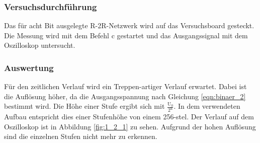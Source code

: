 \documentclass[12pt,a4paper]{article}
\begin{document}
\subsubsection*{Versuchsdurchführung}

Das für acht Bit ausgelegte R-2R-Netzwerk wird auf das Versuchsboard gesteckt. Die Messung wird mit dem Befehl c gestartet und das Ausgangssignal mit dem Oszilloskop  untersucht.

\subsubsection*{Auswertung}

Für den zeitlichen Verlauf wird ein Treppen-artiger Verlauf erwartet. Dabei ist die Auflösung höher, da die Ausgangsspannung nach Gleichung \ref{eqn:binaer_2} bestimmt wird. Die Höhe einer Stufe ergibt sich mit $\frac{\text{U}_0}{2^\text{n}}$. In dem verwendeten Aufbau entspricht dies einer Stufenhöhe von einem 256-stel. Der Verlauf auf dem Oszilloskop ist in Abbildung \ref{fig:1_2_1} zu sehen. Aufgrund der hohen Auflösung sind die einzelnen Stufen nicht mehr zu erkennen.
\end{document}
